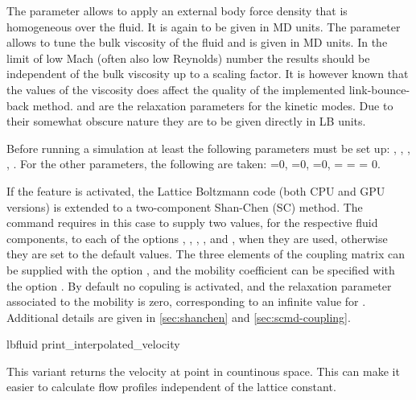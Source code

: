 The parameter  allows to apply an external body force
density that is homogeneous over the fluid. It is again to be given in
MD units.  The parameter  allows to tune the bulk
viscosity of the fluid and is given in MD units. In the limit of low
Mach (often also low Reynolds) number the results should be
independent of the bulk viscosity up to a scaling factor. 
It is however known that the values of the viscosity does 
affect the quality of the implemented link-bounce-back method.
 and
 are the relaxation parameters for the kinetic
modes. Due to their somewhat obscure nature they are to be given
directly in LB units.

Before running a simulation at least the following parameters must be
set up: , , , ,
. For the other parameters, the following are taken:
=0, =0, =0,
 =  =  = 0.

If the feature  is activated, the Lattice Boltzmann
code (both CPU and GPU versions) is extended to a two-component
Shan-Chen (SC) method.  The  command requires in this case
to supply two values, for the respective fluid components, to each
of the options , , , ,
 and , when they are used, otherwise
they are set to the default values. The three elements of the
coupling matrix can be supplied with the option ,
and the mobility coefficient can be
specified with the option . By default no copuling is activated, and the relaxation parameter associated to the mobility is zero, corresponding to an infinite value for . Additional details are
given in \ref{sec:shanchen} and \ref{sec:scmd-coupling}.

\begin{essyntax}
  lbfluid print_interpolated_velocity   
\end{essyntax}
This variant returns the velocity at point in countinous space. 
This can make it easier to calculate flow profiles independent of
the lattice constant.

